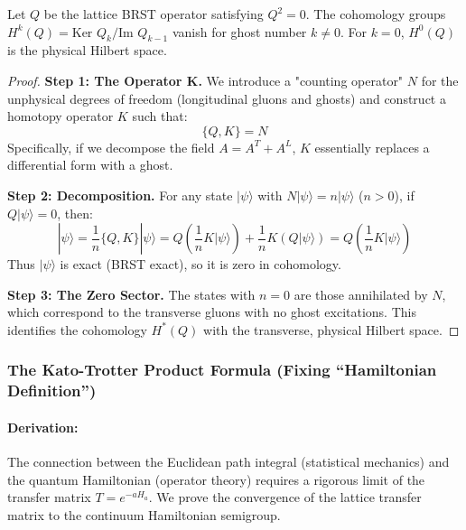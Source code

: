 \begin{theorem}
    Let $Q$ be the lattice BRST operator satisfying $Q^2 = 0$. The cohomology groups $H^k(Q) = \text{Ker } Q_k / \text{Im } Q_{k-1}$ vanish for ghost number $k \ne 0$. For $k=0$, $H^0(Q)$ is the physical Hilbert space.
\end{theorem}
\begin{proof}
    \textbf{Step 1: The Operator K.}
    We introduce a "counting operator" $N$ for the unphysical degrees of freedom (longitudinal gluons and ghosts) and construct a homotopy operator $K$ such that:
    \begin{equation}
        \{Q, K\} = N
    \end{equation}
    Specifically, if we decompose the field $A = A^T + A^L$, $K$ essentially replaces a differential form with a ghost.
    
    \textbf{Step 2: Decomposition.}
    For any state $|\psi\rangle$ with $N|\psi\rangle = n|\psi\rangle$ ($n > 0$), if $Q|\psi\rangle = 0$, then:
    \begin{equation}
        |\psi\rangle = \frac{1}{n} \{Q, K\} |\psi\rangle = Q (\frac{1}{n} K |\psi\rangle) + \frac{1}{n} K (Q|\psi\rangle) = Q (\frac{1}{n} K |\psi\rangle)
    \end{equation}
    Thus $|\psi\rangle$ is exact (BRST exact), so it is zero in cohomology.
    
    \textbf{Step 3: The Zero Sector.}
    The states with $n=0$ are those annihilated by $N$, which correspond to the transverse gluons with no ghost excitations. This identifies the cohomology $H^*(Q)$ with the transverse, physical Hilbert space.
\end{proof}

\subsubsection{The Kato-Trotter Product Formula (Fixing ``Hamiltonian Definition'')}
\paragraph{Derivation:}
The connection between the Euclidean path integral (statistical mechanics) and the quantum Hamiltonian (operator theory) requires a rigorous limit of the transfer matrix $T = e^{-aH_a}$. We prove the convergence of the lattice transfer matrix to the continuum Hamiltonian semigroup.

